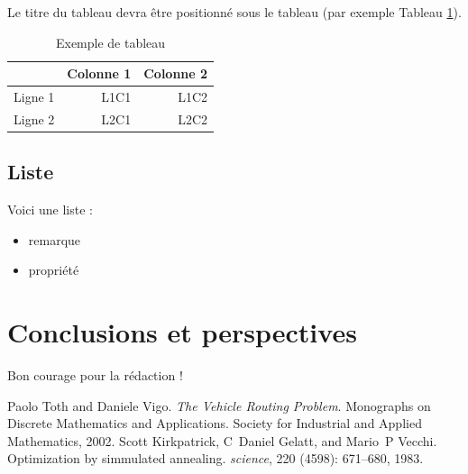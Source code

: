 \documentclass{roadef}
\begin{document}
Le titre du tableau devra être positionné sous le tableau (par exemple Tableau \ref{tableau}).

\begin{table}[!ht]
    \begin{center}
        \begin{tabular}{lrr}
            \hline
            & \multicolumn{1}{c}{Colonne 1} & \multicolumn{1}{c}{Colonne 2}\\
            \hline
            Ligne 1 & L1C1 & L1C2\\
            Ligne 2 & L2C1 & L2C2\\
            \hline
        \end{tabular}
        \caption{Exemple de tableau}
    \label{tableau}
    \end{center}
\end{table}

\subsection{Liste}

Voici une liste :

\begin{itemize}
\item remarque
\item propriété
\end{itemize}

\section{Conclusions et perspectives}

Bon courage pour la rédaction !







\begin{thebibliography}{2}
Paolo Toth and Daniele Vigo.
\newblock \emph{The Vehicle Routing Problem}.
\newblock Monographs on Discrete Mathematics and Applications. Society for Industrial and Applied Mathematics, 2002.
Scott Kirkpatrick, C~Daniel Gelatt, and Mario~P Vecchi.
\newblock Optimization by simmulated annealing.
\newblock \emph{science}, 220 (4598): 671--680, 1983.


\end{thebibliography}
\end{document}
